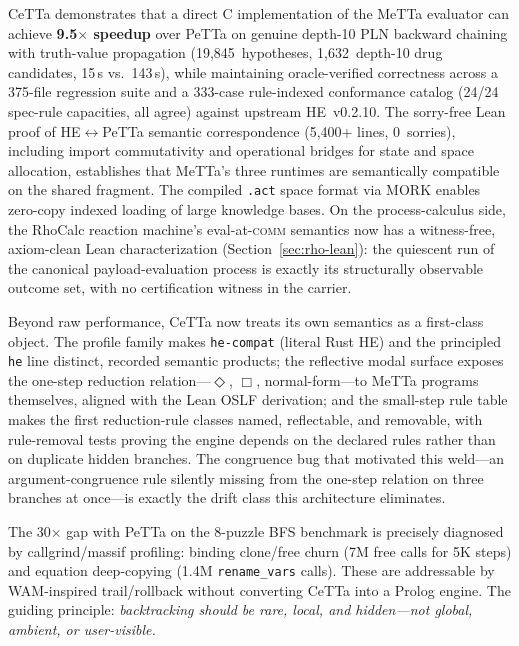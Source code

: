 \documentclass[11pt]{article}
\newcommand{\code}[1]{\texttt{#1}}
\newcommand{\PeTTa}{\textup{PeTTa}}
\newcommand{\HE}{\textup{HE}}
\newcommand{\CeTTa}{\textup{CeTTa}}
\newcommand{\RhoCalc}{\textup{RhoCalc}}
\begin{document}
\CeTTa{} demonstrates that a direct C implementation of the MeTTa
evaluator can achieve \textbf{9.5$\times$ speedup} over \PeTTa{} on
genuine depth-10 PLN backward chaining with truth-value propagation
(19{,}845~hypotheses, 1{,}632~depth-10 drug candidates, 15\,s vs.\
143\,s), while maintaining oracle-verified correctness across a
375-file regression suite and a 333-case rule-indexed conformance
catalog (24/24 spec-rule capacities, all agree) against upstream
\HE{}~v0.2.10.
The sorry-free Lean proof of \HE{}$\leftrightarrow$\PeTTa{} semantic
correspondence (5{,}400+ lines, 0~sorries), including import
commutativity and operational bridges for state and space allocation,
establishes that MeTTa's three runtimes are semantically compatible
on the shared fragment.  The compiled \code{.act} space format via
MORK enables zero-copy indexed loading of large knowledge bases.
On the process-calculus side, the \RhoCalc{} reaction machine's
eval-at-\textsc{comm} semantics now has a witness-free, axiom-clean Lean
characterization (Section~\ref{sec:rho-lean}): the quiescent run of the
canonical payload-evaluation process is exactly its structurally observable
outcome set, with no certification witness in the carrier.

Beyond raw performance, \CeTTa{} now treats its own semantics as a
first-class object.  The profile family makes \code{he-compat} (literal
Rust \HE{}) and the principled \code{he} line distinct, recorded
semantic products; the reflective modal surface exposes the one-step
reduction relation---$\Diamond$, $\Box$, normal-form---to MeTTa
programs themselves, aligned with the Lean OSLF derivation; and the
small-step rule table makes the first reduction-rule classes named,
reflectable, and removable, with rule-removal tests proving the engine
depends on the declared rules rather than on duplicate hidden branches.
The congruence bug that motivated this weld---an argument-congruence
rule silently missing from the one-step relation on three branches at
once---is exactly the drift class this architecture eliminates.

The 30$\times$ gap with \PeTTa{} on the 8-puzzle BFS benchmark
is precisely diagnosed by callgrind/massif profiling: binding
clone/free churn (7M free calls for 5K steps) and equation
deep-copying (1.4M \code{rename\_vars} calls).  These are
addressable by WAM-inspired trail/rollback without converting
\CeTTa{} into a Prolog engine.  The guiding principle:
\emph{backtracking should be rare, local, and hidden---not global,
ambient, or user-visible.}
\end{document}
